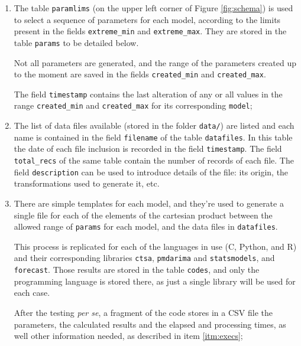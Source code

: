 \documentclass[a4paper,10pt]{article}
\begin{document}
\begin{enumerate}
    \item The table {\tt paramlims} (on the upper left corner of
        Figure \ref{fig:schema}) is used to select a sequence of
        parameters for each model, according to the limits present
        in the fields {\tt extreme\_min} and {\tt extreme\_max}.
        They are stored in the table {\tt params} to be detailed
        below.

        Not all parameters are generated, and the range of the
        parameters created up to the moment are saved in the
        fields {\tt created\_min} and {\tt created\_max}.

        The field {\tt timestamp} contains the last alteration
        of any or all values in the range {\tt created\_min} and
        {\tt created\_max} for its corresponding {\tt model};

    \item The list of data files available (stored in the folder
        {\tt data/}) are listed and each name is contained in the
        field {\tt filename} of the table {\tt datafiles}. In this
        table the date of each file inclusion is recorded in the
        field {\tt timestamp}. The field {\tt total\_recs} of the
        same table contain the number of records of each file.
        The field {\tt description} can be used to introduce
        details of the file: its origin, the transformations used
        to generate it, etc.

    \item \label{itm:codes}
        There are simple templates for each model, and they're
        used to generate a single file for each of the elements of
        the cartesian product between the allowed range of
        {\tt params} for each model, and the data files in
        {\tt datafiles}.

        This process is replicated for each of the languages in
        use (C, Python, and R) and their corresponding libraries
        {\tt ctsa}, {\tt pmdarima} and {\tt statsmodels}, and
        {\tt forecast}. Those results are stored in the table
        {\tt codes}, and only the programming language is stored
        there, as just a single library will be used for each
        case.

        After the testing {\em per se}, a fragment of the code
        stores in a CSV file the parameters, the calculated
        results and the elapsed and processing times, as well
        other information needed, as described in item
        \ref{itm:execs};


\end{enumerate}
\end{document}
